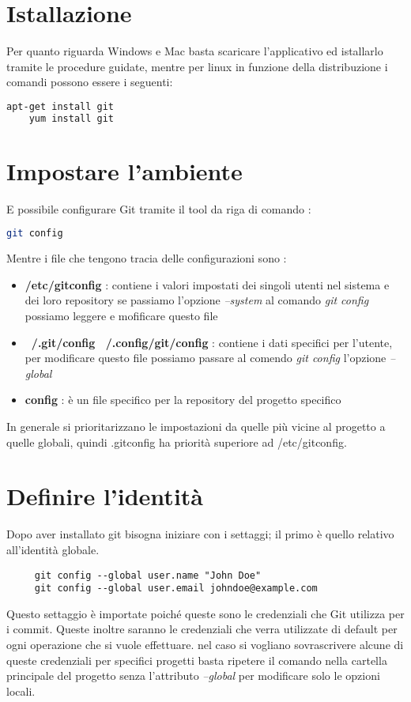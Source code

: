 \section{Istallazione}
Per quanto riguarda Windows e Mac basta scaricare l'applicativo ed istallarlo tramite le procedure guidate, mentre per linux in funzione della distribuzione i comandi possono essere i seguenti: 
\begin{lstlisting}[language = Bash]
	apt-get install git
	yum install git
\end{lstlisting}

\section{Impostare l'ambiente}

E possibile configurare Git tramite il tool da riga di comando :

\begin{lstlisting}[language = Bash]
	git config
\end{lstlisting}

Mentre i file che tengono tracia delle configurazioni sono :
\begin{itemize}
	\item \textbf{/etc/gitconfig} : contiene i valori impostati dei singoli utenti nel sistema e dei loro repository se passiamo l'opzione \textit{--system} al comando \textit{git config} possiamo leggere e mofificare questo file
	
	\item \textbf{~/.git/config    ~/.config/git/config} : contiene i dati specifici per l'utente, per modificare questo file possiamo passare al comendo \textit{git config} l'opzione \textit{--global}
	
	\item \textbf{config} : è un file specifico per la repository del progetto specifico 
\end{itemize}
In generale si prioritarizzano le impostazioni da quelle più vicine al progetto a quelle globali, quindi .gitconfig ha priorità superiore ad /etc/gitconfig.
\section{Definire l'identità}
Dopo aver installato git bisogna iniziare con i settaggi; il primo è quello relativo all'identità globale.
\begin{lstlisting}
	 git config --global user.name "John Doe"
	 git config --global user.email johndoe@example.com
\end{lstlisting}
Questo settaggio è importate poiché queste sono le credenziali che Git utilizza per i commit. Queste inoltre saranno le credenziali che verra utilizzate di default per ogni operazione che si vuole effettuare. nel caso si vogliano sovrascrivere alcune di queste credenziali per specifici progetti basta ripetere il comando nella cartella principale del progetto senza l'attributo \textit{--global} per modificare solo le opzioni locali.
